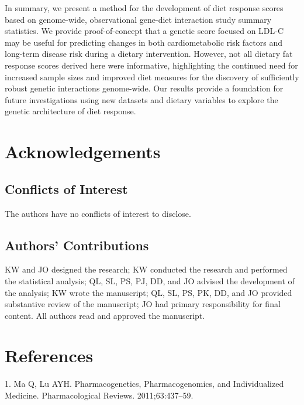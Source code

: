 \documentclass[]{article}
\begin{document}
In summary, we present a method for the development of diet response
scores based on genome-wide, observational gene-diet interaction study
summary statistics. We provide proof-of-concept that a genetic score
focused on LDL-C may be useful for predicting changes in both
cardiometabolic risk factors and long-term disease risk during a dietary
intervention. However, not all dietary fat response scores derived here
were informative, highlighting the continued need for increased sample
sizes and improved diet measures for the discovery of sufficiently
robust genetic interactions genome-wide. Our results provide a
foundation for future investigations using new datasets and dietary
variables to explore the genetic architecture of diet response.

\hypertarget{acknowledgements}{%
\section{Acknowledgements}\label{acknowledgements}}

\hypertarget{conflicts-of-interest}{%
\subsection{Conflicts of Interest}\label{conflicts-of-interest}}

The authors have no conflicts of interest to disclose.

\hypertarget{authors-contributions}{%
\subsection{Authors' Contributions}\label{authors-contributions}}

KW and JO designed the research; KW conducted the research and performed
the statistical analysis; QL, SL, PS, PJ, DD, and JO advised the
development of the analysis; KW wrote the manuscript; QL, SL, PS, PK,
DD, and JO provided substantive review of the manuscript; JO had primary
responsibility for final content. All authors read and approved the
manuscript.

\hypertarget{references}{%
\section*{References}\label{references}}

\hypertarget{refs}{}
\leavevmode\hypertarget{ref-Ma2011}{}%
1. Ma Q, Lu AYH. Pharmacogenetics, Pharmacogenomics, and Individualized
Medicine. Pharmacological Reviews. 2011;63:437--59.
\end{document}
